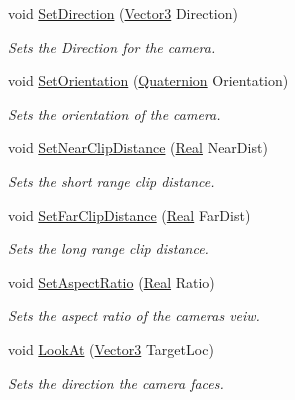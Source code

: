 \begin{DoxyCompactItemize}
void \hyperlink{classphys_1_1Camera_a50746cdd4f7d483edffe87d24d2b4bc6}{SetDirection} (\hyperlink{classphys_1_1Vector3}{Vector3} Direction)
\begin{DoxyCompactList}\small\item\em Sets the Direction for the camera. \item\end{DoxyCompactList}\item 
void \hyperlink{classphys_1_1Camera_af0822410414622c2a3c8b4da207b53ab}{SetOrientation} (\hyperlink{classphys_1_1Quaternion}{Quaternion} Orientation)
\begin{DoxyCompactList}\small\item\em Sets the orientation of the camera. \item\end{DoxyCompactList}\item 
void \hyperlink{classphys_1_1Camera_aff7cb792640b250cafdfbc333de4bbeb}{SetNearClipDistance} (\hyperlink{namespacephys_af7eb897198d265b8e868f45240230d5f}{Real} NearDist)
\begin{DoxyCompactList}\small\item\em Sets the short range clip distance. \item\end{DoxyCompactList}\item 
void \hyperlink{classphys_1_1Camera_a25408db8110ac5035fafbd58a5b1106d}{SetFarClipDistance} (\hyperlink{namespacephys_af7eb897198d265b8e868f45240230d5f}{Real} FarDist)
\begin{DoxyCompactList}\small\item\em Sets the long range clip distance. \item\end{DoxyCompactList}\item 
void \hyperlink{classphys_1_1Camera_a6f895759e653eedb985217c621b265f6}{SetAspectRatio} (\hyperlink{namespacephys_af7eb897198d265b8e868f45240230d5f}{Real} Ratio)
\begin{DoxyCompactList}\small\item\em Sets the aspect ratio of the cameras veiw. \item\end{DoxyCompactList}\item 
void \hyperlink{classphys_1_1Camera_a6534be5001bf06ab4c4b32a084629842}{LookAt} (\hyperlink{classphys_1_1Vector3}{Vector3} TargetLoc)
\begin{DoxyCompactList}\small\item\em Sets the direction the camera faces. \item\end{DoxyCompactList}\item 

\end{DoxyCompactItemize}
